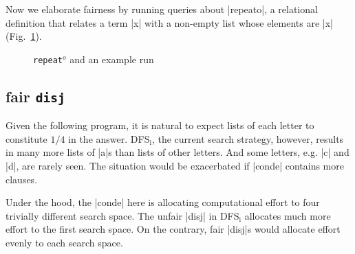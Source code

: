 \documentclass[format=acmlarge, review=true, authordraft=true]{acmart}
\newtheorem{defn}{Definition}[section]
\newcommand{\dfsi}[0]{DFS$_\textrm{i}$}
\begin{document}
Now we elaborate fairness by running queries about \scheme|repeato|, a 
relational definition that relates a term \scheme|x| with a non-empty list whose 
elements are \scheme|x| (Fig.~\ref{repeato}).

% 

\begin{figure}
	\caption{\texttt{repeat$^o$} and an example run}
	\label{repeato}
\end{figure}

\subsection{fair \texttt{disj}}

Given the following program, it is natural to expect lists of each letter to
constitute $1/4$ in the answer. DFS$_\textrm{i}$, the current search
strategy, however, results in many more lists of \scheme|a|s than lists
of other letters. And some letters, e.g. \scheme|c| and \scheme|d|, are
rarely seen. The situation would be exacerbated if \scheme|conde| 
contains more clauses.

\begin{center}
    \begin{schemeregion}
    \end{schemeregion}
\end{center}

Under the hood, the \scheme|conde| here is allocating computational effort to 
four trivially different search space. The unfair \scheme|disj| in 
\dfsi{} allocates much more effort to the first search space. On the contrary, 
fair \scheme|disj|s would allocate effort evenly to each search space.

\begin{center}
    \begin{schemeregion}
    \end{schemeregion}
\end{center}

\begin{center}
    \begin{schemeregion}
    \end{schemeregion}
\end{center}
\end{document}
